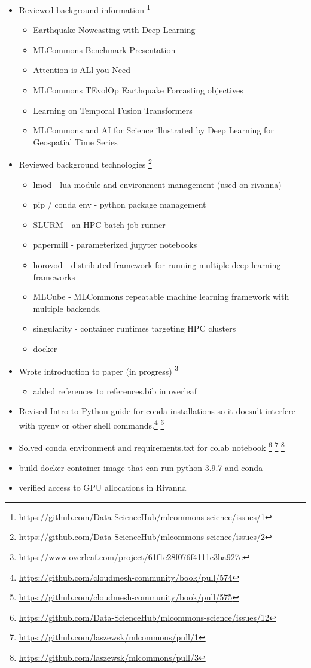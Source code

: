 \documentclass[sigplan,screen]{acmart}
\providecommand{\mlcube}{MLCube}
\begin{document}
\begin{itemize}
\item Reviewed background information \footnote{\url{https://github.com/Data-ScienceHub/mlcommons-science/issues/1}}
    \begin{itemize}
    \item Earthquake Nowcasting with Deep Learning
    \item MLCommons Benchmark Presentation
    \item Attention is ALl you Need
    \item MLCommons TEvolOp Earthquake Forcasting objectives
    \item Learning on Temporal Fusion Transformers
    \item MLCommons and AI for Science illustrated by Deep Learning for Geospatial Time Series
    \end{itemize}
\item Reviewed background technologies \footnote{\url{https://github.com/Data-ScienceHub/mlcommons-science/issues/2}}
    \begin{itemize}
    \item lmod - lua module and environment management (used on rivanna)
    \item pip / conda env - python package management
    \item SLURM - an HPC batch job runner
    \item papermill - parameterized jupyter notebooks
    \item horovod - distributed framework for running multiple deep learning frameworks
    \item \mlcube{} - MLCommons repeatable machine learning framework with multiple backends.
    \item singularity - container runtimes targeting HPC clusters
    \item docker
\end{itemize}
\item Wrote introduction to paper (in progress) \footnote{\url{https://www.overleaf.com/project/61f1e28f076f4111c3ba927e}}
    \begin{itemize}
    \item added references to references.bib in overleaf
    \end{itemize}
\item Revised Intro to Python guide for conda installations so it doesn't interfere with pyenv or other shell commands.\footnote{\url{https://github.com/cloudmesh-community/book/pull/574}} \footnote{\url{https://github.com/cloudmesh-community/book/pull/575}}
\item Solved conda environment and requirements.txt for colab notebook
\footnote{\url{https://github.com/Data-ScienceHub/mlcommons-science/issues/12}} \footnote{\url{https://github.com/laszewsk/mlcommons/pull/1}} \footnote{\url{https://github.com/laszewsk/mlcommons/pull/3}}
\item build docker container image that can run python 3.9.7 and conda
\item verified access to GPU allocations in Rivanna
\end{itemize}
\end{document}
